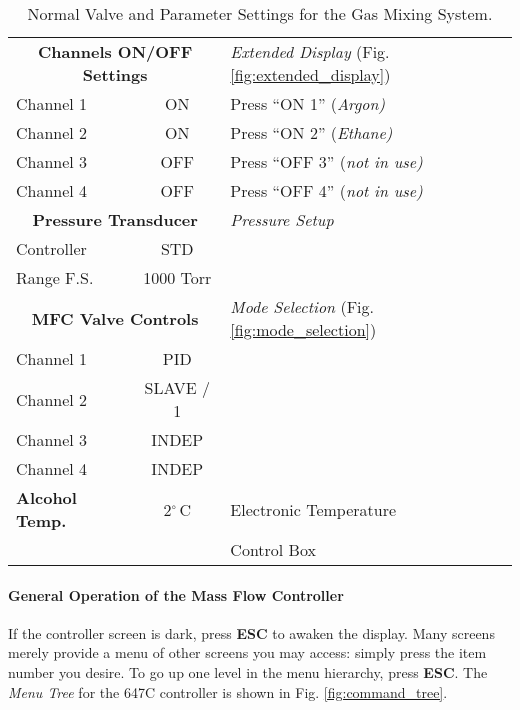 {\begin{table}[hbt]
\begin{minipage}[h!]{\textwidth}
{\begin{center}
\begin{tabular}{|l|c|l|}
\multicolumn{2}{|c|}{\bf Channels ON/OFF Settings} & {\it Extended Display} (Fig. \ref{fig:extended_display})   \\
Channel 1   & ON       &                   Press ``ON 1'' (\em Argon)  \\
Channel 2   & ON       &                   Press ``ON 2'' (\em Ethane) \\
Channel 3   & OFF      &                   Press ``OFF 3'' (\em not in use) \\
Channel 4   & OFF      &                   Press ``OFF 4'' (\em not in use) \\ \hline
\multicolumn{2}{|c|}{\bf Pressure Transducer} & {\it Pressure Setup}  \\
Controller  & STD      &                   \\
Range F.S.  & 1000 Torr&                   \\ \hline
\multicolumn{2}{|c|}{\bf MFC Valve Controls     } & {\it Mode Selection} (Fig. \ref{fig:mode_selection}) \\
Channel 1   & PID      &                                   \\
Channel 2   & SLAVE / 1&                                   \\
Channel 3   & INDEP    &                                   \\
Channel 4   & INDEP    &                                   \\ \hline
\bf Alcohol Temp. & 2$^\circ$\,C & Electronic Temperature  \\
                  &              & Control Box             \\ \hline
\hline
\end{tabular}
\end{center}
}%
\end{minipage}
\caption{Normal Valve and Parameter Settings for the Gas Mixing System.
\label{tab:mixer_nominals}}
\end{table}
\paragraph{General Operation of the Mass Flow Controller}
If the controller screen is dark, press {\bf ESC} to awaken the
display.  Many screens merely provide a menu of other screens you may
access: simply press the item number you desire. To go up one level in
the menu hierarchy, press {\bf ESC}. The \emph{Menu Tree} for the 647C
controller is shown in Fig. \ref{fig:command_tree}.

}
